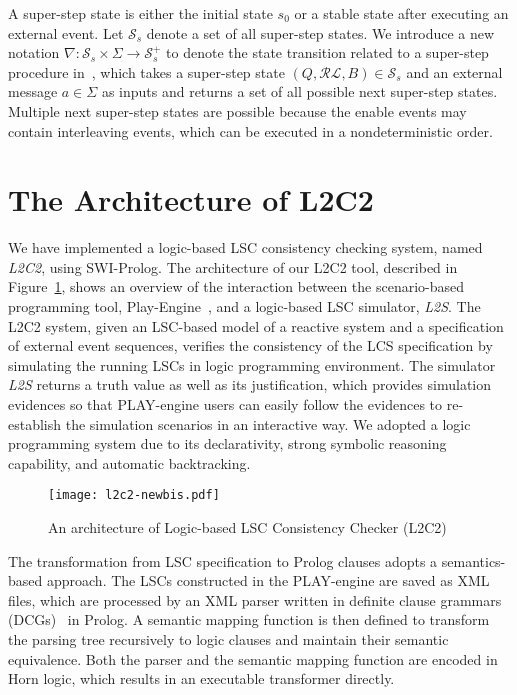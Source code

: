 \documentclass[]{llncs}
\begin{document}
A super-step state is either the initial state $s_0$ or a stable state after executing
an external event. Let $\mathcal{S}_s$ denote a set of all super-step states.
We introduce a new notation
$\nabla: \mathcal{S}_s \times \Sigma \rightarrow \mathcal{S}_s^{+}$
to denote the state transition related to a super-step procedure in~\cite{HM03},
which takes a super-step state $(Q,\mathcal{RL},B) \in \mathcal{S}_s$ and
an external message $a \in \Sigma$ as inputs and
returns a set of all possible next super-step states.
Multiple next super-step states are possible because the enable events
may contain interleaving events, which can be executed in a nondeterministic
order.



\section{The Architecture of L2C2}
\label{sec:l2c2}

We have implemented a logic-based LSC consistency checking
system, named {\em L2C2}, using SWI-Prolog.
The architecture of our L2C2 tool, described in Figure~\ref{fig:l2c2},
shows an overview of the interaction between the scenario-based programming
tool, Play-Engine~\cite{HM03}, and a logic-based LSC simulator,
{\em L2S}. The L2C2 system, given an LSC-based model
of a reactive system and a specification
of external event sequences, verifies the consistency
of the LCS specification by simulating the running LSCs in
logic programming environment. The simulator {\em L2S} returns a
truth value as well as its justification, which provides simulation evidences
so that PLAY-engine users can easily follow the evidences to re-establish
the simulation scenarios in an interactive way. We adopted a logic programming
system due to its declarativity, strong symbolic reasoning capability,
and automatic backtracking.


\begin{figure}
	\centering
\texttt{[image: l2c2-newbis.pdf]}\\
\caption{An architecture of Logic-based LSC Consistency Checker (L2C2)}
\label{fig:l2c2}
\end{figure}



The transformation from LSC specification to Prolog clauses adopts a
semantics-based approach.
The LSCs constructed in the PLAY-engine
are saved as XML files, which are processed by an XML parser written
in definite clause grammars (DCGs)~\cite{Abramson84} in Prolog. A semantic mapping function
is then defined to transform the parsing tree recursively to
logic clauses and maintain their semantic equivalence.
Both the parser and the semantic mapping function are encoded in Horn logic,
which results in an executable transformer directly.
\end{document}

